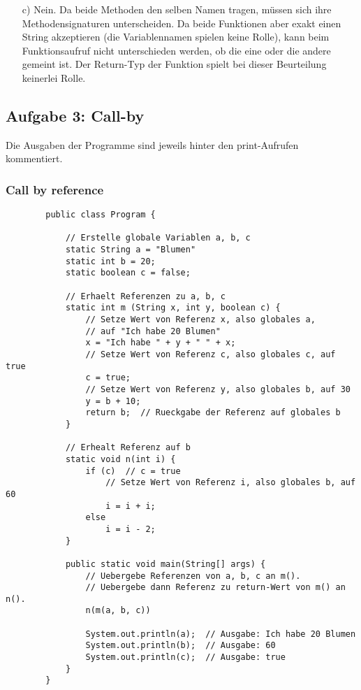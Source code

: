 \documentclass{article}
\begin{document}
\begin{enumerate}
        \item[c)] Nein. Da beide Methoden den selben Namen tragen, müssen sich ihre Methodensignaturen unterscheiden. Da beide Funktionen aber exakt einen String akzeptieren (die Variablennamen spielen keine Rolle), kann beim Funktionsaufruf nicht unterschieden werden, ob die eine oder die andere gemeint ist. Der Return-Typ der Funktion spielt bei dieser Beurteilung keinerlei Rolle. 
    \end{enumerate}
    


    \subsection*{Aufgabe 3: Call-by}
    Die Ausgaben der Programme sind jeweils hinter den print-Aufrufen kommentiert.
    \subsubsection*{Call by reference}
    \begin{lstlisting}
        public class Program {
            
            // Erstelle globale Variablen a, b, c
            static String a = "Blumen"
            static int b = 20;
            static boolean c = false;

            // Erhaelt Referenzen zu a, b, c
            static int m (String x, int y, boolean c) {  
                // Setze Wert von Referenz x, also globales a, 
                // auf "Ich habe 20 Blumen"
                x = "Ich habe " + y + " " + x; 
                // Setze Wert von Referenz c, also globales c, auf true
                c = true;
                // Setze Wert von Referenz y, also globales b, auf 30
                y = b + 10;
                return b;  // Rueckgabe der Referenz auf globales b
            }

            // Erhealt Referenz auf b
            static void n(int i) {
                if (c)  // c = true 
                    // Setze Wert von Referenz i, also globales b, auf 60
                    i = i + i;  
                else
                    i = i - 2;
            }

            public static void main(String[] args) {
                // Uebergebe Referenzen von a, b, c an m().
                // Uebergebe dann Referenz zu return-Wert von m() an n().
                n(m(a, b, c))  

                System.out.println(a);  // Ausgabe: Ich habe 20 Blumen
                System.out.println(b);  // Ausgabe: 60
                System.out.println(c);  // Ausgabe: true
            }
        }
    \end{lstlisting}
\end{document}
